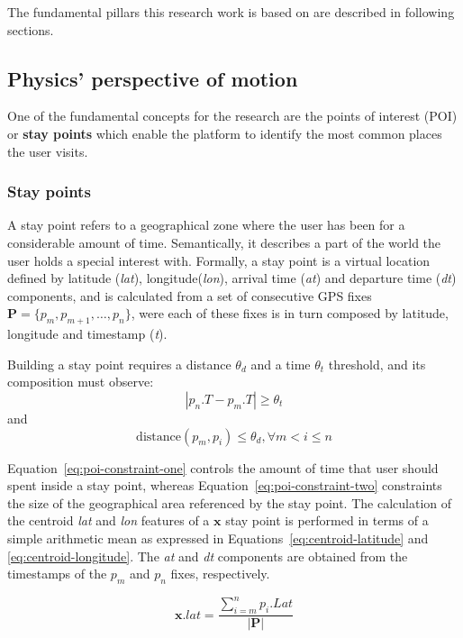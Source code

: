 \documentclass[ENG,PhD]{cinvestav}
\begin{document}
The fundamental pillars this research work is based on are described in following sections.

\subsection{Physics' perspective of motion}
One of the fundamental concepts for the research are the points of interest (POI) or \textbf{stay points} which enable the platform to identify the most common places the user visits.
\subsubsection*{Stay points}
A stay point refers to a geographical zone where the user has been for a considerable amount of time.
Semantically, it describes a part of the world the user holds a special interest with.
Formally, a stay point is a virtual location defined by latitude (\emph{lat}), longitude(\emph{lon}), arrival time (\emph{at}) and departure time (\emph{dt}) components, and is calculated from a set of consecutive GPS fixes $\mathbf{P}=\{p_{m},p_{m+1},\ldots,p_{n}\}$, were each of these fixes is in turn composed by latitude, longitude and timestamp (\emph{t}).

Building a stay point requires a distance $\theta_{d}$ and a time $\theta_{t}$ threshold, and its composition must observe:
\begin{equation}
  \left|p_{n}.T-p_{m}.T\right|\geq\theta_{t}
  \label{eq:poi-constraint-one}
\end{equation}
and
\begin{equation}
  \text{distance}(p_{m},p_{i})\leq\theta_{d}, \forall m<i\leq n
  \label{eq:poi-constraint-two}
\end{equation}

Equation~\ref{eq:poi-constraint-one} controls the amount of time that user should spent inside a stay point, whereas Equation~\ref{eq:poi-constraint-two} constraints the size of the geographical area referenced by the stay point.
The calculation of the centroid \emph{lat} and \emph{lon} features of a $\mathbf{x}$ stay point is performed in terms of a simple arithmetic mean as expressed in Equations~\ref{eq:centroid-latitude} and \ref{eq:centroid-longitude}.
The \emph{at} and \emph{dt} components are obtained from the timestamps of the $p_m$ and $p_n$ fixes, respectively.

\begin{equation}
\mathbf{x}.lat = \frac{ \sum_{i=m}^{n}p_{i}.Lat }{ |\mathbf{P}| }\label{eq:centroid-latitude}
\end{equation}
\end{document}
